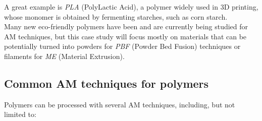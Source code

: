 \documentclass{article}
\begin{document}
    A great example is \textit{PLA} (PolyLactic Acid), a polymer widely used in 3D printing, whose monomer is obtained by fermenting starches, such as corn starch. \\ 

    Many new eco-friendly polymers have been and are currently being studied for AM techniques, but this case study will focus mostly on materials that can be potentially turned 
    into powders for \textit{PBF} (Powder Bed Fusion) techniques or filaments for \textit{ME} (Material Extrusion). 
    
    \subsection{Common AM techniques for polymers\label{AM_techniques_summary}}
    
    Polymers can be processed with several AM techniques, including, but not limited to: 
\end{document}
